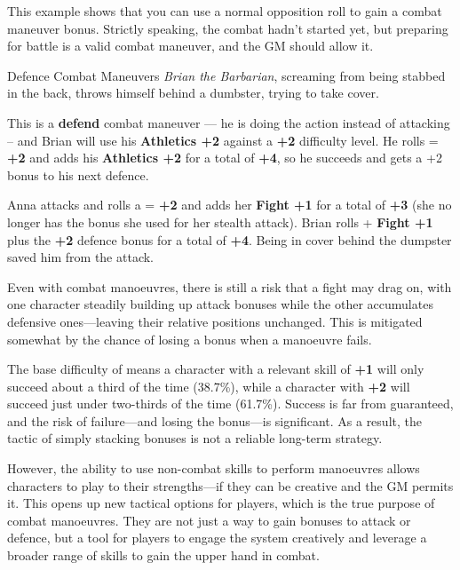 \begin{multicols}{2}
This example shows that you can use a normal opposition roll to gain a combat maneuver bonus. Strictly speaking, the combat hadn't started yet, but preparing for battle is a valid combat maneuver, and the GM should allow it.

\begin{Example}{Defence Combat Maneuvers}
    \emph{Brian the Barbarian}, screaming from being stabbed in the back, throws himself behind a dumbster, trying to take cover. 

    This is a \textbf{defend} combat maneuver --- he is doing the action instead of attacking -- and Brian will use his \textbf{Athletics +2} against a \textbf{+2} difficulty level. He rolls  = \textbf{+2} and adds his \textbf{Athletics +2} for a total of \textbf{+4}, so he succeeds and gets a +2 bonus to his next defence.
    
    Anna attacks and rolls a \FudgeRes{+++-} = \textbf{+2} and adds her \textbf{Fight +1} for a total of \textbf{+3} (she no longer has the bonus she used for her stealth attack). Brian rolls  + \textbf{Fight +1} plus the \textbf{+2} defence bonus for a total of \textbf{+4}. Being in cover behind the dumpster saved him from the attack.
\end{Example}

Even with combat manoeuvres, there is still a risk that a fight may drag on, with one character steadily building up attack bonuses while the other accumulates defensive ones—leaving their relative positions unchanged. This is mitigated somewhat by the chance of losing a bonus when a manoeuvre fails.

The base difficulty of  means a character with a relevant skill of \textbf{+1} will only succeed about a third of the time (38.7\%), while a character with \textbf{+2} will succeed just under two-thirds of the time (61.7\%). Success is far from guaranteed, and the risk of failure—and losing the bonus—is significant. As a result, the tactic of simply stacking bonuses is not a reliable long-term strategy.

However, the ability to use non-combat skills to perform manoeuvres allows characters to play to their strengths—if they can be creative and the GM permits it. This opens up new tactical options for players, which is the true purpose of combat manoeuvres. They are not just a way to gain bonuses to attack or defence, but a tool for players to engage the system creatively and leverage a broader range of skills to gain the upper hand in combat.


\end{multicols}
